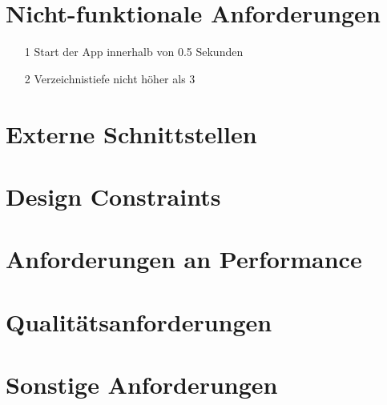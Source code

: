 \section{Nicht-funktionale Anforderungen}
	\begin{itemize}
		\item[1] Start der App innerhalb von 0.5 Sekunden
		\item[2] Verzeichnistiefe nicht höher als 3
	\end{itemize}
	
\section{Externe Schnittstellen}
\section{Design Constraints}
\section{Anforderungen an Performance}
\section{Qualitätsanforderungen}
\section{Sonstige Anforderungen}
